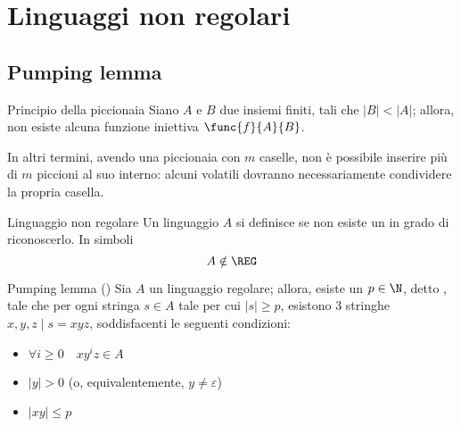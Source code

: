 \documentclass[a4paper, 12pt]{report}
\begin{document}
    \section{Linguaggi non regolari}

    \subsection{Pumping lemma}

    \begin{framedprinc}[label={pigeonhole}]{Principio della piccionaia}
        Siano $A$ e $B$ due insiemi finiti, tali che $|B| < |A|$; allora, non esiste alcuna funzione iniettiva $\func{f}{A}{B}$.

        In altri termini, avendo una piccionaia con $m$ caselle, non è possibile inserire più di $m$ piccioni al suo interno: alcuni volatili dovranno necessariamente condividere la propria casella.
    \end{framedprinc}
    
    \begin{frameddefn}{Linguaggio non regolare}
        Un linguaggio $A$ si definisce  se non esiste un \DFA in grado di riconoscerlo. In simboli $$A \notin \mathrm{\REG}$$
    \end{frameddefn}

    \begin{framedlem}[label={pumping reg}]{Pumping lemma (\REG)}
        Sia $A$ un linguaggio regolare; allora, esiste un $p \in \N$, detto , tale che per ogni stringa $s \in A$ tale per cui $|s| \ge p$, esistono 3 stringhe $x, y, z \mid s = xyz$, soddisfacenti le seguenti condizioni:

        \begin{itemize}
            \item $\forall i \ge 0 \quad xy^iz \in A$
            \item $|y| > 0$ (o, equivalentemente, $y \neq \varepsilon$)
            \item $|xy| \le p$
        \end{itemize}
    \end{framedlem}
\end{document}
